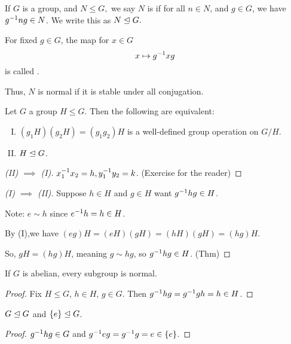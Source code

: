 \documentclass[notes.tex]{subfiles}
\begin{document}
\begin{defn}
	If $G$ is a group, and $N\le G,$ we say $N$ is  if for all $n\in N$, and $g\in G$, we have ${g}^{-1}ng\in N$. We write this as $N\trianglelefteq G.$
\end{defn}
\begin{remark}
	For fixed $g\in G$, the map for $x\in G$ \[
		x\mapsto {g}^{-1}xg
	\]
	is called .
\end{remark}

Thus, $N$ is normal if it is stable under all conjugation.

\begin{theorem}
	Let $G$ a group $H\le G$. Then the following are equivalent:

	\begin{enumerate}[(I)]
		\item $(g_1H)(g_2H) = (g_1g_2)H$ is a well-defined group operation on $G/H$.
		\item $H\trianglelefteq G$.
	\end{enumerate}
	\begin{proof}[(II) $\implies$ (I)]
		${x}^{-1}_1x_2=h, {y}^{-1}_1y_2=k$. (Exercise for the reader) %
 	\end{proof}
	\begin{proof}[(I) $\implies$ (II)]
		Suppose $h\in H$ and $g\in H$
		want ${g}^{-1}hg\in H$.

		Note: $e\sim h$ since ${e}^{-1}h=h\in H$.

		By (I),we have $ (eg)H =(eH)(gH) = (hH)(gH) = (hg)H$.

		So, $gH = (hg)H$, meaning $g\sim hg$, so ${g}^{-1}hg\in H$. \qedhere(Thm)
	\end{proof}
\end{theorem}

\begin{proposition}
	If $G$ is abelian, every subgroup is normal.
\end{proposition}

\begin{proof}
	Fix $H\le G$, $h\in H$, $g\in G.$
	Then ${g}^{-1}hg = {g}^{-1}gh =h\in H$.
\end{proof}

\begin{proposition}
	$G\trianglelefteq G$ and $\{e\}\trianglelefteq G$.
\end{proposition}
\begin{proof}
	${g}^{-1}hg \in G$ and ${g}^{-1}eg = {g}^{-1}g = e\in \{e\}$.
\end{proof}
\end{document}

